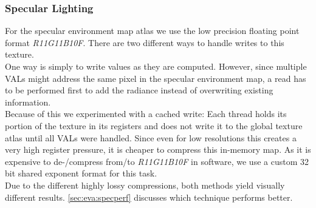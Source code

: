 \documentclass[thesis.tex]{subfiles}
\begin{document}
\subsubsection{Specular Lighting} \label{sec:impl:details:specular}
For the specular environment map atlas we use the low precision floating point format \emph{R11G11B10F}.
There are two different ways to handle writes to this texture.
\\
One way is simply to write values as they are computed.
However, since multiple VALs might address the same pixel in the specular environment map, a read has to be performed first to add the radiance instead of overwriting existing information.
\\
Because of this we experimented with a cached write:
Each thread holds its portion of the texture in its registers and does not write it to the global texture atlas until all VALs were handled.
Since even for low resolutions this creates a very high register pressure, it is cheaper to compress this in-memory map.
As it is expensive to de-/compress from/to \emph{R11G11B10F} in software, we use a custom 32 bit shared exponent format for this task.
\\
Due to the different highly lossy compressions, both methods yield visually different results.
\autoref{sec:eva:specperf} discusses which technique performs better.


\subfilebib %
\end{document}
